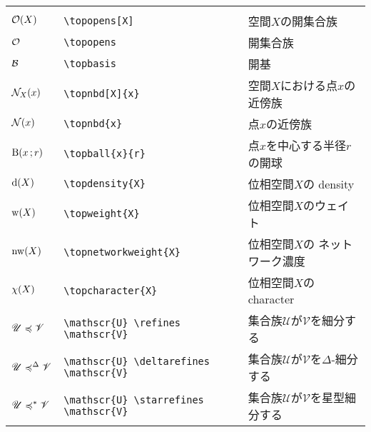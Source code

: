 \documentclass[uplatex, dvipdfmx, 12pt, crop=false]{standalone}
\begin{document}
\begin{table}[htb]
\begin{tabular}{ll@{\qquad}l}
		\tablesubtitle{位相空間に関する数式記号} \\
		$\topopens[X]$                          & \verb|\topopens[X]|                          & 空間$X$の開集合族                                       \\
		$\topopens$                             & \verb|\topopens|                             & 開集合族                                                \\
		$\mathcal{B}$                             & \verb|\topbasis|                             & 開基                                                    \\
		$\topnbd[X]{x}$                         & \verb|\topnbd[X]{x}|                         & 空間$X$における点$x$の近傍族                            \\
		$\topnbd{x}$                            & \verb|\topnbd{x}|                            & 点$x$の近傍族                                           \\
		$\topball{x}{r}$                        & \verb|\topball{x}{r}|                        & 点$x$を中心する半径$r$の開球                            \\
		$\topdensity{X}$                        & \verb|\topdensity{X}|                        & 位相空間$X$の density                                   \\
		$\topweight{X}$                         & \verb|\topweight{X}|                         & 位相空間$X$のウェイト                                   \\
		$\topnetworkweight{X}$                  & \verb|\topnetworkweight{X}|                  & 位相空間$X$の ネットワーク濃度                          \\
		$\topcharacter{X}$                      & \verb|\topcharacter{X}|                      & 位相空間$X$の character                                 \\
		$\mathscr{U} \preccurlyeq \mathscr{V}$      & \verb|\mathscr{U} \refines \mathscr{V}|      & 集合族$\mathscr{U}$が$\mathscr{V}$を細分する            \\
		$\mathscr{U} \preccurlyeq^{\Delta} \mathscr{V}$ & \verb|\mathscr{U} \deltarefines \mathscr{V}| & 集合族$\mathscr{U}$が$\mathscr{V}$を$\Delta$-細分する \\
		$\mathscr{U} \preccurlyeq^{\ast} \mathscr{V}$  & \verb|\mathscr{U} \starrefines \mathscr{V}|  & 集合族$\mathscr{U}$が$\mathscr{V}$を星型細分する        \\
		\hline


\end{tabular}
\end{table}
\end{document}
